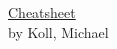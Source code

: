 \documentclass[10pt,landscape,obeyspaces]{article}
\begin{document}
\newlength{\MyLen}
\newlength{\MyLenTwo}

\begin{center}
	\Large{\underline{Cheatsheet}} \\
	\small by Koll, Michael\\
\end{center}
\end{document}
